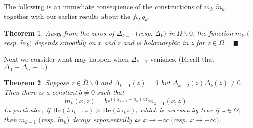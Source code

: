 \documentclass{surv-l}
\theoremstyle{plain}
\newtheorem{theorem}{Theorem}[section]
\theoremstyle{definition}
\numberwithin{equation}{chapter}
\begin{document}
The following is an immediate consequence of the constructions of $m_{k},\tilde{m}_{k}$, together with our earlier results about the $f_{k}, g_{k}$.

\begin{theorem}\label{thm7.26}
Away from the zeros of $\Delta_{k-1}$ $($resp. $\Delta_{k})$ in $\overline{\Omega}\backslash 0$, the function $m_{k}$ $($resp. $\tilde{m}_{k})$ depends smoothly on $x$ and $z$ and is holomorphic in $z$ for $ z\in\Omega.\quad \blacksquare$
\end{theorem}

Next we consider what may happen when $\Delta_{k-1}$ vanishes. (Recall that $\Delta_{0}\equiv \Delta_{n}\equiv 1.)$

\begin{theorem}\label{thm7.27}
Suppose $z\in\overline{\Omega}\backslash 0$ and $\Delta_{k-1}(z)=0$ but $\Delta_{k-2}(z)\Delta_{k}(z)\neq 0$. Then there is a constant $b\neq 0$ such that
\setcounter{equation}{27}
\begin{equation}
\tilde{m}_{k}(x, z)=be^{i(\alpha_{k-1}-\alpha_{k})xz}m_{k-1}(x, z).
\end{equation}
In particular, if $\mathrm{Re}(i\alpha_{k-1}z)>\mathrm{Re}(i\alpha_{k}z)$, which is necessarily true if $ z\in\Omega$, then $m_{k-1}$ $($resp. $\tilde{m}_{k})$ decays exponentially as $ x\rightarrow+\infty\,($resp. $x\rightarrow-\infty)$.
\end{theorem}
\end{document}
